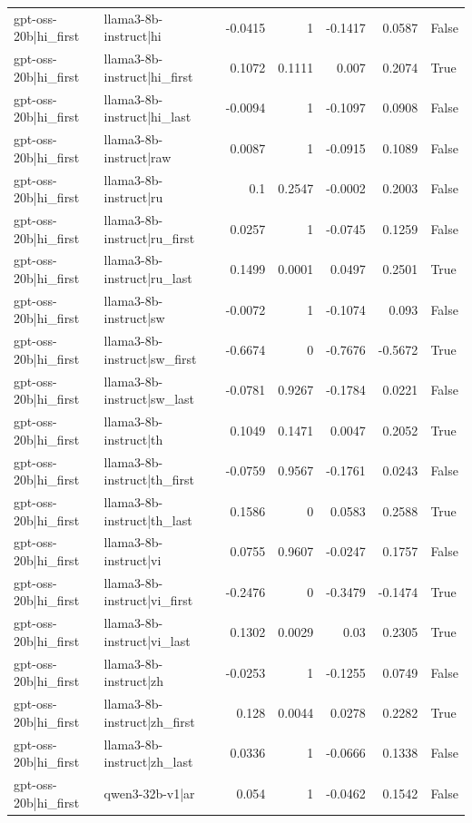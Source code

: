 \begin{table}
\begin{tabular}{l l r r r r l}
gpt-oss-20b|hi_first & llama3-8b-instruct|hi & -0.0415 & 1 & -0.1417 & 0.0587 & False \\
gpt-oss-20b|hi_first & llama3-8b-instruct|hi_first & 0.1072 & 0.1111 & 0.007 & 0.2074 & True \\
gpt-oss-20b|hi_first & llama3-8b-instruct|hi_last & -0.0094 & 1 & -0.1097 & 0.0908 & False \\
gpt-oss-20b|hi_first & llama3-8b-instruct|raw & 0.0087 & 1 & -0.0915 & 0.1089 & False \\
gpt-oss-20b|hi_first & llama3-8b-instruct|ru & 0.1 & 0.2547 & -0.0002 & 0.2003 & False \\
gpt-oss-20b|hi_first & llama3-8b-instruct|ru_first & 0.0257 & 1 & -0.0745 & 0.1259 & False \\
gpt-oss-20b|hi_first & llama3-8b-instruct|ru_last & 0.1499 & 0.0001 & 0.0497 & 0.2501 & True \\
gpt-oss-20b|hi_first & llama3-8b-instruct|sw & -0.0072 & 1 & -0.1074 & 0.093 & False \\
gpt-oss-20b|hi_first & llama3-8b-instruct|sw_first & -0.6674 & 0 & -0.7676 & -0.5672 & True \\
gpt-oss-20b|hi_first & llama3-8b-instruct|sw_last & -0.0781 & 0.9267 & -0.1784 & 0.0221 & False \\
gpt-oss-20b|hi_first & llama3-8b-instruct|th & 0.1049 & 0.1471 & 0.0047 & 0.2052 & True \\
gpt-oss-20b|hi_first & llama3-8b-instruct|th_first & -0.0759 & 0.9567 & -0.1761 & 0.0243 & False \\
gpt-oss-20b|hi_first & llama3-8b-instruct|th_last & 0.1586 & 0 & 0.0583 & 0.2588 & True \\
gpt-oss-20b|hi_first & llama3-8b-instruct|vi & 0.0755 & 0.9607 & -0.0247 & 0.1757 & False \\
gpt-oss-20b|hi_first & llama3-8b-instruct|vi_first & -0.2476 & 0 & -0.3479 & -0.1474 & True \\
gpt-oss-20b|hi_first & llama3-8b-instruct|vi_last & 0.1302 & 0.0029 & 0.03 & 0.2305 & True \\
gpt-oss-20b|hi_first & llama3-8b-instruct|zh & -0.0253 & 1 & -0.1255 & 0.0749 & False \\
gpt-oss-20b|hi_first & llama3-8b-instruct|zh_first & 0.128 & 0.0044 & 0.0278 & 0.2282 & True \\
gpt-oss-20b|hi_first & llama3-8b-instruct|zh_last & 0.0336 & 1 & -0.0666 & 0.1338 & False \\
gpt-oss-20b|hi_first & qwen3-32b-v1|ar & 0.054 & 1 & -0.0462 & 0.1542 & False \\

\end{tabular}
\end{table}
